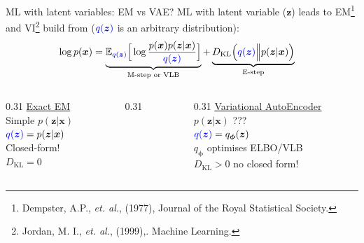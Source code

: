 \documentclass[aspectratio=169]{beamer}
\newcommand{\bs}[1]{\boldsymbol{#1}}
\begin{document}
\begin{frame}{ML with latent variables: EM vs VAE?}
ML with latent variable ($\bs{z}$) leads to EM\footnote{Dempster, A.P., \textit{et. al.}, (1977), Journal of the Royal Statistical Society.} and VI\footnote{Jordan, M. I., \textit{et. al.}, (1999),. Machine Learning.} build from {\footnotesize($\color{blue}q(\bs{z})$ is an arbitrary distribution)}:
\begin{align*}
\log p(\bs{x}) &= \underbrace{\mathbb{E}_{\color{blue}q(\bs{z})}\Big[\log \frac{p(\bs{x})p(\bs{z}|\bs{x})}{\color{blue}q(\bs{z})}\Big]}_{\text{M-step or VLB}} +  \underbrace{D_{\text{KL}}\Big({\color{blue}q(\bs{z})}\Big\lVert p(\bs{z}|\bs{x})\Big)}_{\text{E-step}}
\end{align*}
\begin{columns}
 \begin{column}{0.31\textwidth}
  \centering
  \underline{Exact EM}\\
  Simple $p(\bs{z}|\bs{x})$ \\
  ${\color{blue}q(\bs{z})}=p(\bs{z}|\bs{x})$\\
  Closed-form!\\
  $D_{\text{KL}} = 0$
 \end{column}
 \begin{column}{0.31\textwidth}

 \end{column}%
  \begin{column}{0.31\textwidth}
 \centering
  \underline{Variational AutoEncoder}\\
  $p(\bs{z}|\bs{x})$ ???\\
  ${\color{blue}q(\bs{z})} = q_{\bs{\phi}}(\bs{z})$\\
  $q_{\bs{\phi}}$ optimises ELBO/VLB\\
  $D_{\text{KL}}>0$ no closed form!
 \end{column}
\end{columns}
\end{frame}
\end{document}
